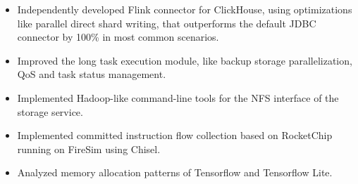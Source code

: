\documentclass{resume}
\newcommand{\en}[1]{#1}
\newcommand{\zh}[1]{}
\begin{document}
\en{}
\zh{\datedsubsection{\textbf{\href{https://www.aliyun.com/}{阿里云计算有限公司（Alibaba Cloud）}}}{2020/07 -- 2020/08}}
\en{}
\zh{\role{OLAP 产品部}{研发实习}}
\begin{itemize}
      \item \en{Independently developed Flink connector for ClickHouse, using optimizations like parallel direct shard writing, that outperforms the default JDBC connector by 100\% in most common scenarios.}
            \zh{为 ClickHouse 开发了 Flink connector，应用了直写 local 表等优化，在大部分场景下相较默认 JDBC connector 提升写入性能约 100\%。}
\end{itemize}

\en{}
\zh{\datedsubsection{\textbf{\href{https://www.smartx.com/}{北京志凌海纳科技有限公司（SmartX Inc.）}}}{2019/09 -- 2020/01}}
\en{}
\zh{\role{分布式存储系统(ZBS)}{C++研发实习}}
\begin{itemize}
      \item \en{Improved the long task execution module, like backup storage parallelization, QoS and task status management.}
            \zh{改进了 ZBS 的长任务执行模块（Task Center），如支持备份存储过程批并行化、QoS 限速及任务的状态控制等。}
      \item \en{Implemented Hadoop-like command-line tools for the NFS interface of the storage service.}
            \zh{为存储服务的 NFS 接口实现了一整套类似于 Hadoop HDFS 的命令行工具。}
\end{itemize}

\en{}
\zh{\datedsubsection{\textbf{清华大学网络大数据技术研究中心}}{2020/02 -- 2020/07}}
\en{}
\zh{\role{RISC-V 可信执行环境}{科研实习}}
\begin{itemize}
      \item \en{Implemented committed instruction flow collection based on RocketChip running on FireSim using Chisel.}
            \zh{使用 Chisel 语言，实现了 FireSim 上基于 RocketChip 的指令流收集。}
      \item \en{Analyzed memory allocation patterns of Tensorflow and Tensorflow Lite.}
            \zh{分析了 Tensorflow 与 Tensorflow Lite 框架内存分配的特征。}
\end{itemize}
\end{document}
